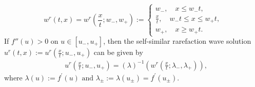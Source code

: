 \documentclass[10pt,reqno]{amsart}
\numberwithin{equation}{section}
\begin{document}
	\begin{equation}\label{wr}
		w^r(t, x)=w^r\left(\frac{x}{t} ; w_{-}, w_{+}\right):=\begin{cases}
			w_{-}, \quad x \leq w_{-} t, \\
			\frac{x}{t}, \quad w_{-} t \leq x \leq w_{+} t, \\
			w_{+}, \quad x \geq w_{+} t.
		\end{cases}
	\end{equation}
	If $f''(u)>0$ on $u\in [u_-,u_+]$, then the self-similar rarefaction wave solution $u^{r}(t, x):=u^{r}(\frac{x}{t};u_-,u_+)$ can be given by
	\begin{equation}\label{RW}
		\begin{aligned}
			&u^r\left(\frac{x}{t} ; u_{-}, u_{+}\right)=(\lambda)^{-1}\left(w^r\left(\frac{x}{t} ; \lambda_{-}, \lambda_{+}\right)\right),
		\end{aligned}
	\end{equation}
	where $\lambda(u):=f^{\prime}(u) \text { and } \lambda_{ \pm}:=\lambda\left(u_{ \pm}\right)=f^{\prime}\left(u_{ \pm}\right)$.
\end{document}
